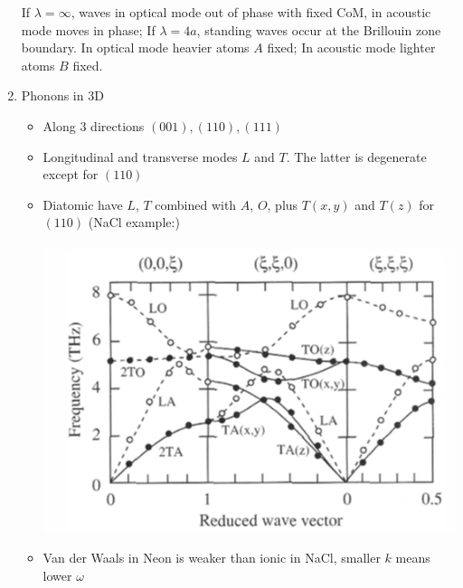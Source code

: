 \documentclass{article}
\theoremstyle{remark}
\theoremstyle{remark}
\begin{document}
\begin{enumerate}
        If $\lambda=\infty$, waves in optical mode out of phase with fixed CoM, in acoustic mode moves in phase;
        If $\lambda=4a$, standing waves occur at the Brillouin zone boundary. In optical mode heavier atoms $A$ fixed; In acoustic mode lighter atoms $B$ fixed.
        
    \item Phonons in 3D\begin{itemize}
        \item Along 3 directions $(001),(110),(111)$
        \item Longitudinal and transverse modes $L$ and $T$. The latter is degenerate except for $(110)$
        \item Diatomic have $L$, $T$ combined with $A$, $O$, plus $T(x,y)$ and $T(z)$ for $(110)$ (NaCl example:)
            \begin{center}
                \includegraphics*[width=0.4\linewidth]{cmp_dispersion_3d_nacl.png}
            \end{center}
        \item Van der Waals in Neon is weaker than ionic in NaCl, smaller $k$ means lower $\omega$
    \end{itemize}
    

\end{enumerate}
\end{document}
